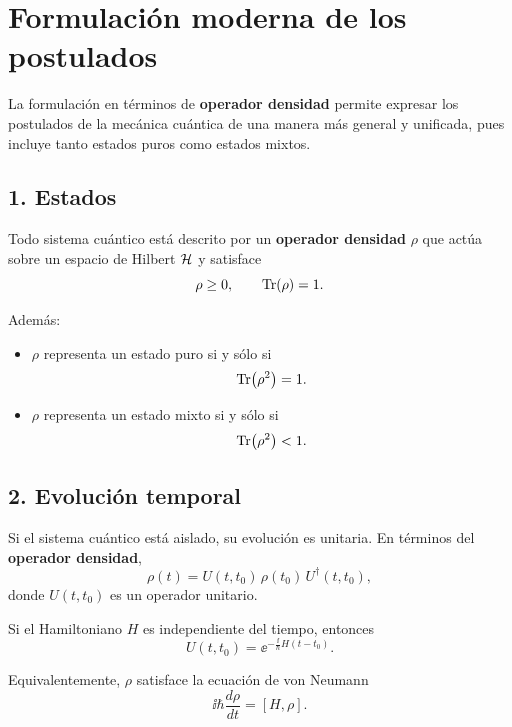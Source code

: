 \documentclass[../main.tex]{subfiles}
\begin{document}
\section{Formulación moderna de los postulados}

La formulación en términos de \textbf{operador densidad} permite expresar los postulados de la mecánica cuántica de una manera más general y unificada, pues incluye tanto estados puros como estados mixtos.

\subsection*{1. Estados}

Todo sistema cuántico está descrito por un \textbf{operador densidad} $\rho$ que actúa sobre un espacio de Hilbert $\mathcal{H}$ y satisface
\begin{equation*}
    \rho \geq 0,
    \qquad
    \Tr(\rho)=1.
\end{equation*}

Además:
\begin{itemize}
    \item $\rho$ representa un estado puro si y sólo si
    \begin{equation*}
        \Tr(\rho^2)=1.
    \end{equation*}

    \item $\rho$ representa un estado mixto si y sólo si
    \begin{equation*}
        \Tr(\rho^2)<1.
    \end{equation*}
\end{itemize}

\subsection*{2. Evolución temporal}

Si el sistema cuántico está aislado, su evolución es unitaria. En términos del \textbf{operador densidad},
\begin{equation*}
    \rho(t)=U(t,t_0)\,\rho(t_0)\,U^\dagger(t,t_0),
\end{equation*}
donde $U(t,t_0)$ es un operador unitario.

Si el Hamiltoniano $H$ es independiente del tiempo, entonces
\begin{equation*}
    U(t,t_0)=\ee^{-\frac{\ii}{\hbar}H(t-t_0)}.
\end{equation*}

Equivalentemente, $\rho$ satisface la ecuación de von Neumann
\begin{equation*}
    \ii\hbar \frac{d\rho}{dt} = [H,\rho].
\end{equation*}
\end{document}
